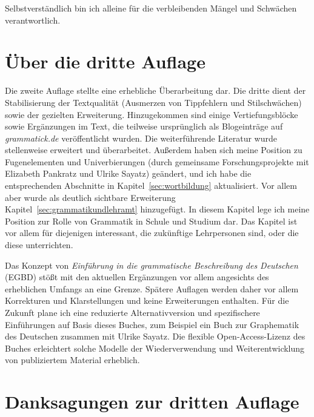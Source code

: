 Selbstverständlich bin ich alleine für die verbleibenden Mängel und Schwächen verantwortlich.


\section*{Über die dritte Auflage}
\label{sec:ueberdiedritteauflage}

Die zweite Auflage stellte eine erhebliche Überarbeitung dar.
Die dritte dient der Stabilisierung der Textqualität (Ausmerzen von Tippfehlern und Stilschwächen) sowie der gezielten Erweiterung.
Hinzugekommen sind einige Vertiefungsblöcke sowie Ergänzungen im Text, die teilweise ursprünglich als Blogeinträge auf \textit{grammatick.de} veröffentlicht wurden.
Die weiterführende Literatur wurde stellenweise erweitert und überarbeitet.
Außerdem haben sich meine Position zu Fugenelementen und Univerbierungen (durch gemeinsame Forschungsprojekte mit Elizabeth Pankratz und Ulrike Sayatz) geändert, und ich habe die entsprechenden Abschnitte in Kapitel~\ref{sec:wortbildung} aktualisiert.
Vor allem aber wurde als deutlich sichtbare Erweiterung Kapitel~\ref{sec:grammatikundlehramt} hinzugefügt.
In diesem Kapitel lege ich meine Position zur Rolle von Grammatik in Schule und Studium dar.
Das Kapitel ist vor allem für diejenigen interessant, die zukünftige Lehrpersonen sind, oder die diese unterrichten.

Das Konzept von \textit{Einführung in die grammatische Beschreibung des Deutschen} (\mbox{EGBD}) stößt mit den aktuellen Ergänzungen vor allem angesichts des erheblichen Umfangs an eine Grenze.
Spätere Auflagen werden daher vor allem Korrekturen und Klarstellungen und keine Erweiterungen enthalten.
Für die Zukunft plane ich eine reduzierte Alternativversion und spezifischere Einführungen auf Basis dieses Buches, zum Beispiel ein Buch zur Graphematik des Deutschen zusammen mit Ulrike Sayatz.
Die flexible Open-Access-Lizenz des Buches erleichtert solche Modelle der Wiederverwendung und Weiterentwicklung von publiziertem Material erheblich.

\section*{Danksagungen zur dritten Auflage}
\label{sec:danksagungenzurdrittenauflage}

